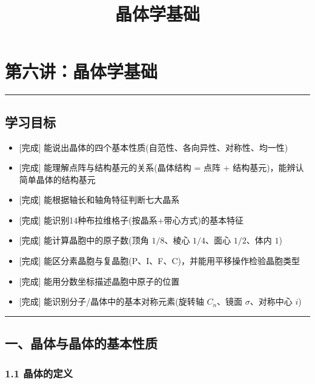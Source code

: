 \documentclass[a4paper,11pt]{ctexart}
\title{晶体学基础}
\date{}
\providecommand{\tightlist}{\setlength{\itemsep}{0pt}\setlength{\parskip}{0pt}}
\newcommand{\箭}{\ensuremath{\rightarrow}}
\newcommand{\左箭}{\ensuremath{\leftarrow}}
\newcommand{\上箭}{\ensuremath{\uparrow}}
\newcommand{\下箭}{\ensuremath{\downarrow}}
\newcommand{\衡}{\ensuremath{\rightleftharpoons}}
\newcommand{\双箭}{\ensuremath{\leftrightarrow}}
\newcommand{\约等于}{\ensuremath{\approx}}
\newcommand{\小于等于}{\ensuremath{\leq}}
\newcommand{\大于等于}{\ensuremath{\geq}}
\newcommand{\不等于}{\ensuremath{\neq}}
\newcommand{\西格马}{\ensuremath{\sigma}}
\newcommand{\派}{\ensuremath{\pi}}
\begin{document}
\maketitle
\tableofcontents
\newpage
\section{第六讲：晶体学基础}\label{ux7b2cux516dux8bb2ux6676ux4f53ux5b66ux57faux7840}

\begin{center}\rule{0.5\linewidth}{0.5pt}\end{center}

\subsection{学习目标}\label{ux5b66ux4e60ux76eeux6807}

\begin{itemize}
\tightlist
\item
  {[}完成{]} 能说出晶体的四个基本性质(自范性、各向异性、对称性、均一性)
\item
  {[}完成{]} 能理解点阵与结构基元的关系(晶体结构 = 点阵 + 结构基元)，能辨认简单晶体的结构基元
\item
  {[}完成{]} 能根据轴长和轴角特征判断七大晶系
\item
  {[}完成{]} 能识别14种布拉维格子(按晶系+带心方式)的基本特征
\item
  {[}完成{]} 能计算晶胞中的原子数(顶角 \(1/8\)、棱心 \(1/4\)、面心 \(1/2\)、体内 \(1\))
\item
  {[}完成{]} 能区分素晶胞与复晶胞(P、I、F、C)，并能用平移操作检验晶胞类型
\item
  {[}完成{]} 能用分数坐标描述晶胞中原子的位置
\item
  {[}完成{]} 能识别分子/晶体中的基本对称元素(旋转轴 \(C_n\)、镜面 \(\sigma\)、对称中心 \(i\))
\end{itemize}

\begin{center}\rule{0.5\linewidth}{0.5pt}\end{center}

\subsection{一、晶体与晶体的基本性质}\label{ux4e00ux6676ux4f53ux4e0eux6676ux4f53ux7684ux57faux672cux6027ux8d28}

\subsubsection{1.1 晶体的定义}\label{ux6676ux4f53ux7684ux5b9aux4e49}
\end{document}
